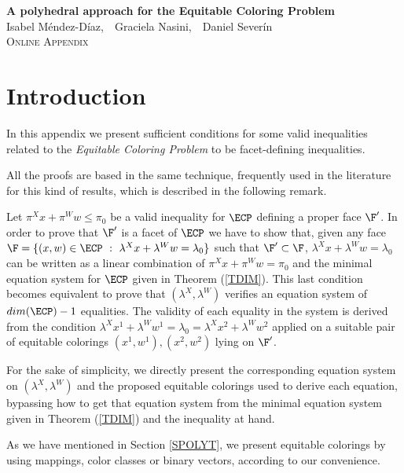 
\appendix

\begin{center} {\Large
\textbf{A polyhedral approach for the Equitable Coloring Problem}}\\[12pt]
Isabel M\'endez-D\'iaz,~~Graciela Nasini,~~Daniel Sever\'in\\[12pt]
\textsc{Online Appendix}
\end{center}

\section{Introduction} 

In this appendix we present sufficient conditions for some valid inequalities related to the \emph{Equitable Coloring Problem}
to be facet-defining inequalities.



All the proofs are based in the same technique, frequently used in the
literature for this kind of results, which is described in the following
remark.

\begin{trem} \label{TECHNIQUE}
Let $\pi^X x + \pi^W w \leq \pi_0$ be a valid inequality for $\ECP$ defining a proper face $\F'$.
In order to prove that $\F'$ is a facet of $\ECP$ we have to show that, given any face $\F = \{ (x,w) \in \ECP ~:~ \lambda^X x + \lambda^W w = \lambda_0\}$ such that $\F' \subset \F$, $\lambda^X x + \lambda^W w = \lambda_0$ can be written as a linear combination of $\pi^X x + \pi^W w = \pi_0$ and the minimal equation system for $\ECP$ given in Theorem (\ref{TDIM}). This last condition becomes equivalent to prove that $(\lambda^X, \lambda^W)$ verifies an equation system of $dim(\ECP)-1$ equalities.
The validity of each equality in the system is derived from the condition 
$\lambda^X x^1 + \lambda^W w^1 = \lambda_0 = \lambda^X x^2 + \lambda^W w^2$ applied on a suitable pair of equitable colorings $(x^1, w^1), (x^2,w^2)$ lying on $\F'$.
\end{trem}

For the sake of simplicity, we directly present the corresponding equation system on $(\lambda^X, \lambda^W)$ and the proposed equitable colorings used to derive each equation, bypassing how to get that equation system from the minimal equation system given in Theorem (\ref{TDIM}) and the inequality at hand.

As we have mentioned in Section \ref{SPOLYT}, we present equitable colorings by using mappings, color classes or binary vectors, according to our convenience.







